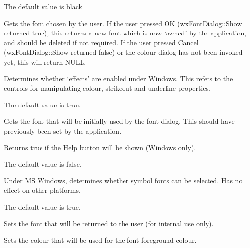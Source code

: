 The default value is black.



Gets the font chosen by the user. If the user pressed OK (wxFontDialog::Show returned true), this returns
a new font which is now `owned' by the application, and should be deleted
if not required. If the user pressed Cancel (wxFontDialog::Show returned false) or
the colour dialog has not been invoked yet, this will return NULL.



Determines whether `effects' are enabled under Windows. This refers to the
controls for manipulating colour, strikeout and underline properties.

The default value is true.



Gets the font that will be initially used by the font dialog. This should have
previously been set by the application.



Returns true if the Help button will be shown (Windows only).

The default value is false.



Under MS Windows, determines whether symbol fonts can be selected. Has no
effect on other platforms.

The default value is true.



Sets the font that will be returned to the user (for internal use only).



Sets the colour that will be used for the font foreground colour.


